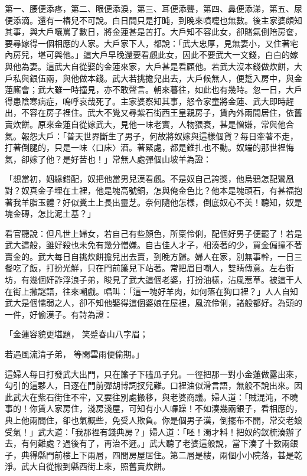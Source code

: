 第一、腰便添疼，第二、眼便添淚，第三、耳便添聾，第四、鼻便添涕，第五、尿便添滴。還有一樁兒不可說。白日間只是打盹，到晚來噴嚏也無數。後主家婆頗知其事，與大戶嚷罵了數日，將金蓮甚是苦打。大戶知不容此女，卻賭氣倒陪房奩，要尋嫁得一個相應的人家。大戶家下人，都說：「武大忠厚，見無妻小，又住著宅內房兒，堪可與他。」這大戶早晚還要看覷此女，因此不要武大一文錢，白白的嫁與他為妻。這武大自從娶的金蓮來家，大戶甚是看顧他。若武大沒本錢做炊餅，大戶私與銀伍兩，與他做本錢。武大若挑擔兒出去，大戶候無人，便踅入房中，與金蓮廝會；武大雖一時撞見，亦不敢聲言。朝來暮往，如此也有幾時。忽一日，大戶得患陰寒病症，嗚呼哀哉死了。主家婆察知其事，怒令家童將金蓮、武大即時趕出，不容在房子裡住。武大不覺又尋紫石街西王皇親房子，賃內外兩間居住，依舊賣炊餅。原來金蓮自從嫁武大，見他一味老實，人物猥衰，甚是憎嫌，常與他合氣。報怨大戶：「普天世界斷生了男子，何故將奴嫁與這樣個貨？每日牽著不走，打著倒腿的，只是一味〈口床〉酒。著緊處，都是錐扎也不動。奴端的那世裡悔氣，卻嫁了他？是好苦也！」常無人處彈個山坡羊為證：

「想當初，姻緣錯配，奴把他當男兒漢看覷。不是奴自己誇獎，他烏鴉怎配鸞凰對？奴真金子埋在土裡，他是塊高號銅，怎與俺金色比？他本是塊頑石，有甚福抱著我羊脂玉體？好似糞土上長出靈芝。奈何隨他怎樣，倒底奴心不美！聽知，奴是塊金磚，怎比泥土基？」

看官聽說：但凡世上婦女，若自己有些顏色，所稟伶俐，配個好男子便罷了！若是武大這般，雖好殺也未免有幾分憎嫌。自古佳人才子，相湊著的少，買金偏撞不著賣金的。武大每日自挑炊餅擔兒出去賣，到晚方歸。婦人在家，別無事幹，一日三餐吃了飯，打扮光鮮，只在門前簾兒下站著。常把眉目嘲人，雙睛傳意。左右街坊，有幾個奸詐浮浪子弟，睃見了武大這個老婆，打扮油樣，沾風惹草。被這干人在街上撒謎語，往來嘲戲。唱叫：「這一塊好羊肉，如何落在狗口裡？」人人自知武大是個懦弱之人，卻不知他娶得這個婆娘在屋裡，風流伶俐，諸般都好。為頭的一件，好偷漢子。有詩為證：

「金蓮容貌更堪題，  笑蹙春山八字眉；

若遇風流清子弟，  等閑雲雨便偷期。」

這婦人每日打發武大出門，只在簾子下磕瓜子兒。一徑把那一對小金蓮做露出來，勾引的這夥人，日逐在門前彈胡博詞扠兒難。口裡油似滑言語，無般不說出來。因此武大在紫石街住不牢，又要往別處搬移，與老婆商議。婦人道：「賊混沌，不曉事的！你賃人家房住，淺房淺屋，可知有小人囉躁！不如湊幾兩銀子，看相應的，典上他兩間住，卻也氣概些，免受人欺負。你是個男子漢，倒擺布不開，常交老娘受氣！」武大道：「我那裡有錢典房？」婦人道：「呸！濁才料！把奴的釵梳湊辦了去，有何難處？過後有了，再治不遲。」武大聽了老婆這般說，當下湊了十數兩銀子，典得縣門前樓上下兩層，四間房屋居住。第二層是樓，兩個小小院落，甚是乾淨。武大自從搬到縣西街上來，照舊賣炊餅。

